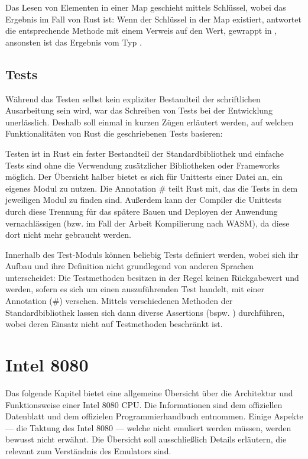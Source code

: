 Das Lesen von Elementen in einer Map geschieht mittels Schlüssel, wobei das Ergebnis im Fall von Rust  ist: Wenn der Schlüssel in der Map existiert, antwortet die entsprechende Methode mit einem Verweis auf den Wert, gewrappt in , ansonsten ist das Ergebnis vom Typ .

\subsection{Tests}

Während das Testen selbst kein expliziter Bestandteil der schriftlichen Ausarbeitung sein wird, war das Schreiben von Tests bei der Entwicklung unerlässlich. Deshalb soll einmal in kurzen Zügen erläutert werden, auf welchen Funktionalitäten von Rust die geschriebenen Tests basieren:

Testen ist in Rust ein fester Bestandteil der Standardbibliothek und einfache Tests sind ohne die Verwendung zusätzlicher Bibliotheken oder Frameworks möglich. Der Übersicht halber bietet es sich für Unittests einer Datei an, ein eigenes Modul zu nutzen. Die Annotation \# teilt Rust mit, das die Tests in dem jeweiligen Modul zu finden sind. Außerdem kann der Compiler die Unittests durch diese Trennung für das spätere Bauen und Deployen der Anwendung vernachlässigen (bzw. im Fall der Arbeit Kompilierung nach \ac{WASM}), da diese dort nicht mehr gebraucht werden.

Innerhalb des Test-Moduls können beliebig Tests definiert werden, wobei sich ihr Aufbau und ihre Definition nicht grundlegend von anderen Sprachen unterscheidet: Die Testmethoden besitzen in der Regel keinen Rückgabewert und werden, sofern es sich um einen auszuführenden Test handelt, mit einer Annotation (\#\rust{[test]}) versehen. Mittels verschiedenen Methoden der Standardbibliothek lassen sich dann diverse Assertions (bspw. ) durchführen, wobei deren Einsatz nicht auf Testmethoden beschränkt ist.

\section{Intel 8080}\label{chap:basics:intel8080}

Das folgende Kapitel bietet eine allgemeine Übersicht über die Architektur und Funktionsweise einer Intel 8080 \ac{CPU}. Die Informationen sind dem offiziellen Datenblatt\cite{datasheet} und dem offizielen Programmierhandbuch\cite{progManual} entnommen.
Einige Aspekte --- \zB die Taktung des Intel 8080 --- welche nicht emuliert werden müssen, werden bewusst nicht erwähnt. Die Übersicht soll ausschließlich Details erläutern, die relevant zum Verständnis des Emulators sind.

